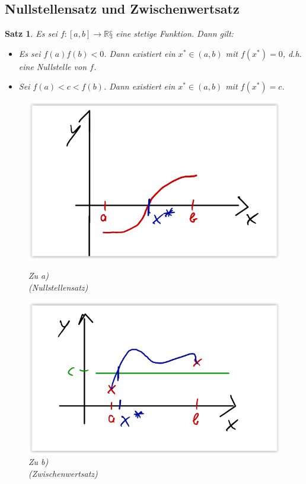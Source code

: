 \documentclass[12pt,a4paper]{report}%
\newtheorem{satz}{Satz}[section]
\numberwithin{equation}{section}
\newcommand{\R}{\mathbb{R}} %
\numberwithin{equation}{subsection}
\begin{document}
  \subsection{Nullstellensatz und Zwischenwertsatz}
  \begin{satz}
    Es sei $f: [a,b]\rightarrow \R§$ eine stetige Funktion. Dann gilt:
    \begin{itemize}
      \item[a) ] Es sei $f(a)f(b) < 0$. Dann existiert ein $x^*\in(a,b)$ mit $f(x^*) = 0$, d.h. eine Nullstelle von $f$.
      \item[b) ] Sei $f(a) < c < f(b)$. Dann existiert ein $x^* \in (a,b)$ mit $f(x^*) = c$.
    \end{itemize}
    \begin{figure}[H] 
			\centering
			\begin{minipage}{.5\textwidth}
			  \centering
			  \captionsetup{justification=centering}
			  \includegraphics[width=0.75\linewidth]{potenzreihen_nullstellensatz.png}
			  \caption{Zu a) \\ (Nullstellensatz) \protect\cite{HM12}}
			  \label{fig:reihe_potenzradius_r}
			\end{minipage}%
			\begin{minipage}{.5\textwidth}
			  \centering
			  \captionsetup{justification=centering}
			  \includegraphics[width=0.8\linewidth]{potenzreihen_zwischenwertsatz.png}
			  \caption{Zu b) \\ (Zwischenwertsatz) \protect\cite{HM12}}
			  \label{fig:reihe_potenzradius_c}
			\end{minipage}
    \end{figure}
  \end{satz}
\end{document}
